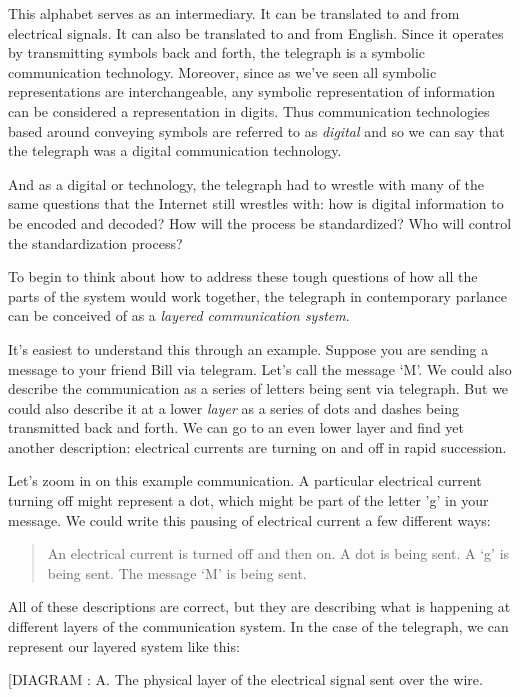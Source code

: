 \documentclass[UTF8]{book}
\begin{document}
\begin{CJK}{UTF8}{gbsn}
This alphabet serves as an intermediary. It can be translated to and from electrical signals. It can also be translated to and from English. Since it operates by transmitting symbols back and forth, the telegraph is a symbolic communication technology. Moreover, since as we've seen all symbolic representations are interchangeable, any symbolic representation of information can be considered a representation in digits. Thus communication technologies based around conveying symbols are referred to as \emph{digital} and so we can say that the telegraph was a digital communication technology.

And as a digital or technology, the telegraph had to wrestle with many of the same questions that the Internet still wrestles with: how is digital information to be encoded and decoded? How will the process be standardized? Who will control the standardization process?

To begin to think about how to address these tough questions of how all the parts of the system would work together, the telegraph in contemporary parlance can be conceived of as a \emph{layered communication system}.

It's easiest to understand this through an example. Suppose you are sending a message to your friend Bill via telegram. Let's call the message `M'. We could also describe the communication as a series of letters being sent via telegraph. But we could also describe it at a lower \emph{layer} as a series of dots and dashes being transmitted back and forth. We can go to an even lower layer and find yet another description: electrical currents are turning on and off in rapid succession.

Let's zoom in on this example communication. A particular electrical current turning off might represent a dot, which might be part of the letter 'g' in your message. We could write this pausing of electrical current a few different ways:

\begin{quotation}
\centering
An electrical current is turned off and then on.
A dot is being sent.
A `g' is being sent.
The message `M' is being sent.
\end{quotation}

All of these descriptions are correct, but they are describing what is happening at different layers of the communication system. In the case of the telegraph, we can represent our layered system like this:

[DIAGRAM :
A. The physical layer of the electrical signal sent over the wire.


\end{CJK}
\end{document}
